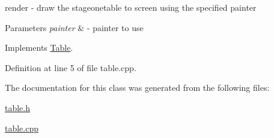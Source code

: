 render -\/ draw the stageonetable to screen using the specified painter 


\begin{DoxyParams}{Parameters}
{\em painter} & -\/ painter to use \\
\hline
\end{DoxyParams}


Implements \mbox{\hyperlink{class_table_a827dac18920a95b3e0ef006183514654}{Table}}.



Definition at line 5 of file table.\+cpp.



The documentation for this class was generated from the following files\+:\begin{DoxyCompactItemize}
\item 
\mbox{\hyperlink{table_8h}{table.\+h}}\item 
\mbox{\hyperlink{table_8cpp}{table.\+cpp}}\end{DoxyCompactItemize}
